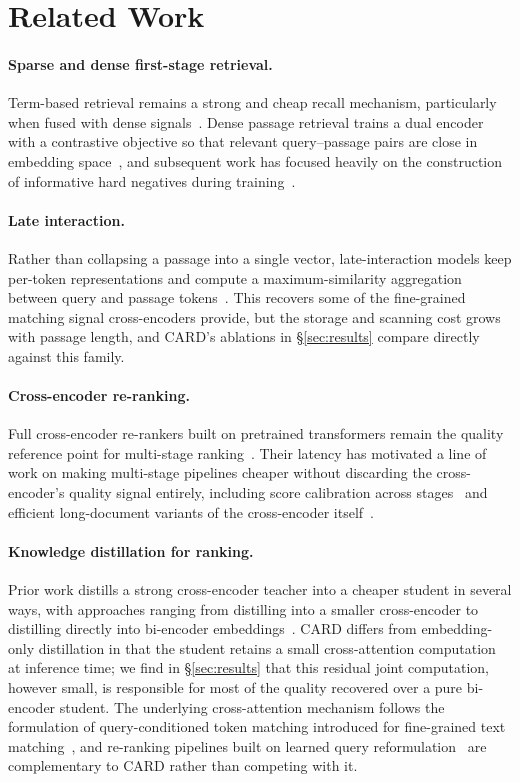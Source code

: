 \section{Related Work}
\label{sec:related}

\paragraph{Sparse and dense first-stage retrieval.} Term-based retrieval
remains a strong and cheap recall mechanism, particularly when fused with
dense signals~\cite{kessler2021fusion}. Dense passage retrieval trains a
dual encoder with a contrastive objective so that relevant query--passage
pairs are close in embedding space~\cite{aldana2020dpr}, and subsequent work
has focused heavily on the construction of informative hard negatives during
training~\cite{solano2022hardneg}.

\paragraph{Late interaction.} Rather than collapsing a passage into a single
vector, late-interaction models keep per-token representations and compute a
maximum-similarity aggregation between query and passage
tokens~\cite{solheim2020late}. This recovers some of the fine-grained
matching signal cross-encoders provide, but the storage and scanning cost
grows with passage length, and CARD's ablations in
\S\ref{sec:results} compare directly against this family.

\paragraph{Cross-encoder re-ranking.} Full cross-encoder re-rankers built on
pretrained transformers remain the quality reference point for multi-stage
ranking~\cite{marchetti2020monobert}. Their latency has motivated a line of
work on making multi-stage pipelines cheaper without discarding the
cross-encoder's quality signal entirely, including score calibration across
stages~\cite{lindberg2023calibrate} and efficient long-document variants of
the cross-encoder itself~\cite{obinna2021longdoc}.

\paragraph{Knowledge distillation for ranking.} Prior work distills a strong
cross-encoder teacher into a cheaper student in several ways, with
approaches ranging from distilling into a smaller cross-encoder to
distilling directly into bi-encoder embeddings~\cite{renner2021distill,
fakhoury2022survey}. CARD differs from embedding-only distillation in that
the student retains a small cross-attention computation at inference time;
we find in \S\ref{sec:results} that this residual joint computation, however
small, is responsible for most of the quality recovered over a pure
bi-encoder student. The underlying cross-attention mechanism follows the
formulation of query-conditioned token matching introduced for fine-grained
text matching~\cite{voss2019crossattn}, and re-ranking pipelines built on
learned query reformulation~\cite{vong2022reform} are complementary to CARD
rather than competing with it.
